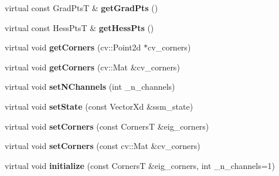 \begin{DoxyCompactItemize}
\item 
\hypertarget{classStateSpaceModel_ae8255e1c441159eb090aca872bb83d70}{virtual const Grad\-Pts\-T \& {\bfseries get\-Grad\-Pts} ()}\label{classStateSpaceModel_ae8255e1c441159eb090aca872bb83d70}

\item 
\hypertarget{classStateSpaceModel_a2c5061bfc6441e01164c50343616feea}{virtual const Hess\-Pts\-T \& {\bfseries get\-Hess\-Pts} ()}\label{classStateSpaceModel_a2c5061bfc6441e01164c50343616feea}

\item 
\hypertarget{classStateSpaceModel_a288778a0c735f8759362cece4a31a2a7}{virtual void {\bfseries get\-Corners} (cv\-::\-Point2d $\ast$cv\-\_\-corners)}\label{classStateSpaceModel_a288778a0c735f8759362cece4a31a2a7}

\item 
\hypertarget{classStateSpaceModel_a9db874f66ba2ff130719a80ba8348ade}{virtual void {\bfseries get\-Corners} (cv\-::\-Mat \&cv\-\_\-corners)}\label{classStateSpaceModel_a9db874f66ba2ff130719a80ba8348ade}

\item 
\hypertarget{classStateSpaceModel_a302d86e171a123932477c56e191f5f18}{virtual void {\bfseries set\-N\-Channels} (int \-\_\-n\-\_\-channels)}\label{classStateSpaceModel_a302d86e171a123932477c56e191f5f18}

\item 
\hypertarget{classStateSpaceModel_ae7e89511cd71018a38cf78c52e6d1c56}{virtual void {\bfseries set\-State} (const Vector\-Xd \&ssm\-\_\-state)}\label{classStateSpaceModel_ae7e89511cd71018a38cf78c52e6d1c56}

\item 
\hypertarget{classStateSpaceModel_aeb5db576866d3baf2383393622cccab4}{virtual void {\bfseries set\-Corners} (const Corners\-T \&eig\-\_\-corners)}\label{classStateSpaceModel_aeb5db576866d3baf2383393622cccab4}

\item 
\hypertarget{classStateSpaceModel_a31783c4608560245a8438a05b8047d91}{virtual void {\bfseries set\-Corners} (const cv\-::\-Mat \&cv\-\_\-corners)}\label{classStateSpaceModel_a31783c4608560245a8438a05b8047d91}

\item 
\hypertarget{classStateSpaceModel_a5c528e5683990a0829a19f1ed5f973a9}{virtual void {\bfseries initialize} (const Corners\-T \&eig\-\_\-corners, int \-\_\-n\-\_\-channels=1)}\label{classStateSpaceModel_a5c528e5683990a0829a19f1ed5f973a9}


\end{DoxyCompactItemize}
